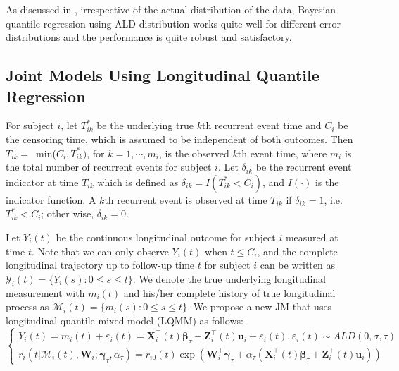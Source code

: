 As discussed in \cite{yu2001bayesian}, irrespective of the actual distribution of the data, Bayesian quantile regression using ALD distribution works quite well for different error distributions and the performance is quite robust and satisfactory.

\subsection{Joint Models Using Longitudinal Quantile Regression}
For subject $i$, let $T_{ik}^*$ be the underlying true $k$th recurrent event time and $C_i$ be the censoring time, which is assumed to be independent of both outcomes. Then $T_{ik} = $\mbox{ min}($C_i, T_{ik}^*)$, for $k=1, \cdots, m_i$, is the observed $k$th event time, where $m_i$ is the total number of recurrent events for subject $i$. Let $\delta_{ik}$ be the recurrent event indicator at time $T_{ik}$ which is defined as $\delta_{ik} = I(T_{ik}^* < C_i)$, and $I(\cdot)$ is the indicator function. A $k$th recurrent event is observed at time $T_{ik}$ if $\delta_{ik}=1$, i.e. $T_{ik}^* < C_i$; other wise, $\delta_{ik}=0$.

Let $Y_{i}(t)$ be the continuous longitudinal outcome for subject $i$ measured at time $t$. Note that we can only observe $Y_{i}(t)$ when $t\le C_i$, and the complete longitudinal trajectory up to follow-up time $t$ for subject $i$ can be written as $\mathcal{Y}_{i}(t)=\{Y_{i}(s): 0\le s\le t\}$. We denote the true underlying longitudinal measurement with $m_{i}(t)$ and his/her complete history of true longitudinal process as $\mathcal{M}_{i}(t)=\{m_{i}(s): 0\le s \le t\}$. We propose a new JM that uses longitudinal quantile mixed model (LQMM) as follows:
\begin{equation}\label{eqn:p2joint}
\left\{
\begin{array}{l}
Y_{i}(t) = m_{i}(t) + \varepsilon_{i}(t) = {\boldsymbol X}_{i}^{\top}(t)\boldsymbol{\beta}_{\tau} + {\boldsymbol Z}_{i}^{\top}(t){\boldsymbol u}_i + \varepsilon_{i}(t), \varepsilon_{i}(t)\sim ALD(0, \sigma, \tau)\\
r_i(t|\mathcal{M}_{i}(t), {\boldsymbol W}_i;  \boldsymbol{\gamma}_{\tau}, \alpha_{\tau}) = r_{i0}(t)\exp({\boldsymbol W}_i^{\top}\boldsymbol{\gamma}_{\tau} + \alpha_{\tau}({\boldsymbol X}^{\top}_{i}(t)\boldsymbol{\beta}_{\tau} + {\boldsymbol Z}^{\top}_{i}(t){\boldsymbol u}_{i}))
\end{array}
\right.
\end{equation}

